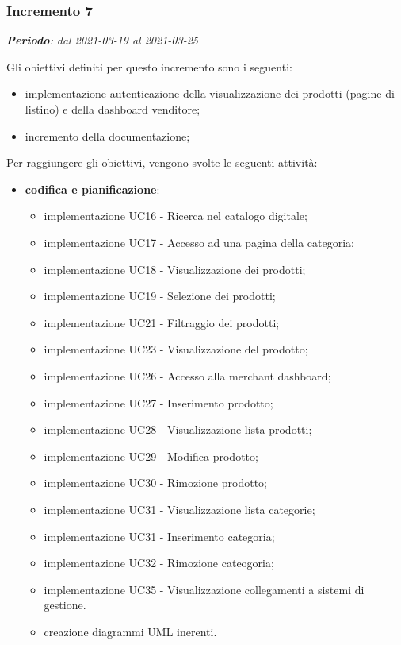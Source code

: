 \subsubsection{Incremento 7}
\textit{\textbf{Periodo}: dal 2021-03-19 al 2021-03-25}

Gli obiettivi definiti per questo incremento sono i seguenti:
\begin{itemize}
\item implementazione autenticazione della visualizzazione dei prodotti (pagine di listino) e della dashboard venditore;
\item incremento della documentazione;
\end{itemize}

Per raggiungere gli obiettivi, vengono svolte le seguenti attività:
\begin{itemize}

\item \textbf{codifica e pianificazione}:
\begin{itemize}
\item implementazione UC16 - Ricerca nel catalogo digitale;
\item implementazione UC17 - Accesso ad una pagina della categoria;
\item implementazione UC18 - Visualizzazione dei prodotti;
\item implementazione UC19 - Selezione dei prodotti;
\item implementazione UC21 - Filtraggio dei prodotti;
\item implementazione UC23 - Visualizzazione del prodotto;
\item implementazione UC26 - Accesso alla merchant dashboard;
\item implementazione UC27 - Inserimento prodotto;
\item implementazione UC28 - Visualizzazione lista prodotti;
\item implementazione UC29 - Modifica prodotto;
\item implementazione UC30 - Rimozione prodotto;
\item implementazione UC31 - Visualizzazione lista categorie;
\item implementazione UC31 - Inserimento categoria;
\item implementazione UC32 - Rimozione cateogoria;
\item implementazione UC35 - Visualizzazione collegamenti a sistemi di gestione.
\item creazione diagrammi UML inerenti.


\end{itemize}
\end{itemize}
